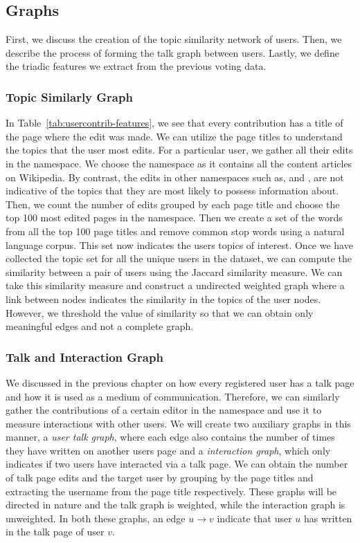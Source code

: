 \subsection{Graphs}
First, we discuss the creation of the topic similarity network of users.
Then, we describe the process of forming the talk graph between users.
Lastly, we define the triadic features we extract from the previous voting data. 

\subsubsection{Topic Similarly Graph}
In Table~\ref{tab:usercontrib-features}, we see that every contribution has a title of the page where the edit was made.
We can utilize the page titles to understand the topics that the user most edits.
For a particular user, we gather all their edits in the \mainNS namespace.
We choose the \mainNS namespace as it contains all the content articles on Wikipedia.
By contrast, the edits in other namespaces such as, \userNS and \helpNS, are not indicative of the topics that they are most likely to possess information about.
Then, we count the number of edits grouped by each page title and choose the top 100 most edited pages in the \mainNS namespace.
Then we create a set of the words from all the top 100 page titles and remove common stop words using a natural language corpus.
This set now indicates the users topics of interest.
Once we have collected the topic set for all the unique users in the \wikirfa dataset, we can compute the similarity between a pair of users using the Jaccard similarity measure. 
We can take this similarity measure and construct a undirected weighted graph where a link between nodes indicates the similarity in the topics of the user nodes.
However, we threshold the value of similarity so that we can obtain only meaningful edges and not a complete graph.

\subsubsection{Talk and Interaction Graph}
We discussed in the previous chapter on how every registered user has a talk page and how it is used as a medium of communication. 
Therefore, we can similarly gather the contributions of a certain editor in the \usertalkNS namespace and use it to measure interactions with other users.
We will create two auxiliary graphs in this manner, a \textit{user talk graph}, where each edge also contains the number of times they have written on another users page and a \textit{interaction graph}, which only indicates if two users have interacted via a talk page. 
We can obtain the number of talk page edits and the target user by grouping by the page titles and extracting the username from the page title respectively. 
These graphs will be directed in nature and the talk graph is weighted, while the interaction graph is unweighted. 
In both these graphs, an edge $u \rightarrow v$ indicate that user $u$ has written in the talk page of user $v$.

